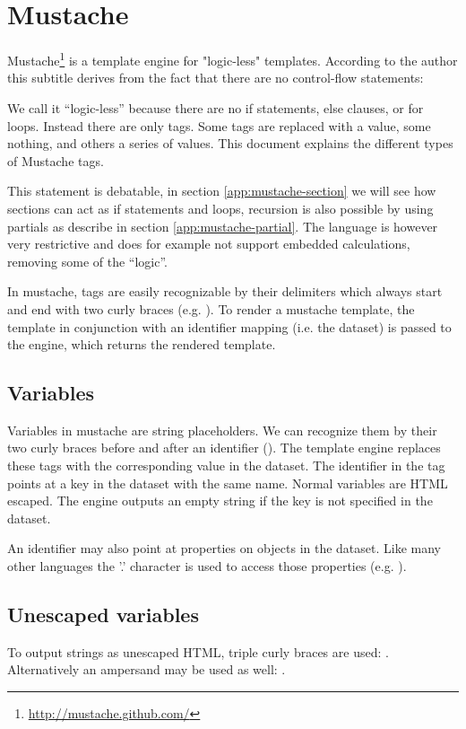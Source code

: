 \documentclass[thesis.tex]{subfiles}
\begin{document}
\chapter{Mustache}
\label{app:mustache}
Mustache\footnote{\url{http://mustache.github.com/}} is a template engine for
"logic-less" templates.
According to the author this subtitle derives from the fact that there are no
control-flow statements:
\begin{citequote}{\cite{MUSTACHE5}}
We call it ``logic-less'' because there are no if statements, else clauses, or for
loops. Instead there are only tags. Some tags are replaced with a value, some
nothing, and others a series of values. This document explains the different
types of Mustache tags.
\end{citequote}
This statement is debatable, in section \ref{app:mustache-section} we
will see how sections can act as if statements and loops, recursion is
also possible by using partials as describe in
section \ref{app:mustache-partial}.
The language is however very restrictive and does for example not support
embedded calculations, removing some of the ``logic''. 

In mustache, tags are easily recognizable by their delimiters which always start
and end with two curly braces (e.g. ).
To render a mustache template, the template in conjunction with an
identifier mapping (i.e. the dataset) is passed to the engine, which returns the
rendered template.

\section{Variables}
\label{app:mustache-vars}
Variables in mustache are string placeholders. We can recognize them by their
two curly braces before and after an identifier ().
The template engine replaces these tags with the corresponding value in the
dataset.
The identifier in the tag points at a key in the dataset with the same name.
Normal variables are HTML escaped. The engine outputs an empty string if the
key is not specified in the dataset.

An identifier may also point at properties on objects in the dataset. Like many
other languages the '.' character is used to access those properties (e.g.
).

\section{Unescaped variables}
\label{app:mustache-unescaped}
To output strings as unescaped HTML, triple curly braces are used:
. Alternatively an ampersand may be used as well:
.
\end{document}

